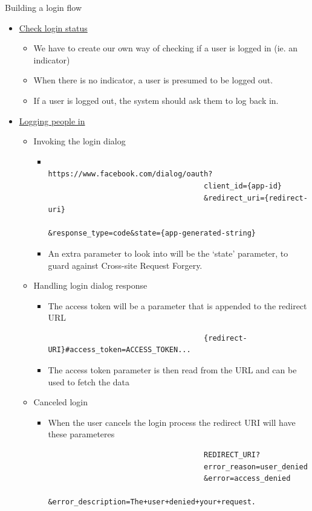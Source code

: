 \documentclass{article}
\begin{document}
			Building a login flow
			\begin{itemize}
				\item \href{https://developers.facebook.com/docs/facebook-login/manually-build-a-login-flow#checklogin}{Check login status}
					\begin{itemize}
						\item We have to create our own way of checking if a user is logged in (ie. an indicator)
						\item When there is no indicator, a user is presumed to be logged out.
						\item If a user is logged out, the system should ask them to log back in.
					\end{itemize}
				\item \href{https://developers.facebook.com/docs/facebook-login/manually-build-a-login-flow#login}{Logging people in}
					\begin{itemize}
						\item Invoking the login dialog
							\begin{itemize}
								\item
									\begin{verbatim}
									https://www.facebook.com/dialog/oauth?
									client_id={app-id}
									&redirect_uri={redirect-uri}
									&response_type=code&state={app-generated-string}
									\end{verbatim}
								\item An extra parameter to look into will be the `state' parameter, to guard against Cross-site Request Forgery.
							\end{itemize}
						\item Handling login dialog response
							\begin{itemize}
								\item The access token will be a parameter that is appended to the redirect URL
								\begin{verbatim}
									{redirect-URI}#access_token=ACCESS_TOKEN...
								\end{verbatim}
								\item The access token parameter is then read from the URL and can be used to fetch the data
							\end{itemize}
						\item Canceled login
							\begin{itemize}
								\item When the user cancels the login process the redirect URI will have these parameteres
								\begin{verbatim}
									REDIRECT_URI?
  									error_reason=user_denied
  									&error=access_denied
  									&error_description=The+user+denied+your+request.
								\end{verbatim}
							\end{itemize}
					\end{itemize}


\end{itemize}
\end{document}
